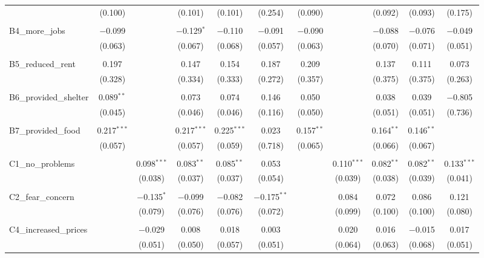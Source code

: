 \begin{table}[H]
\begin{tabular}{@{\extracolsep{4pt}}lcccccccccc}
  & (0.100) &  & (0.101) & (0.101) & (0.254) & (0.090) &  & (0.092) & (0.093) & (0.175) \\ 
  & & & & & & & & & & \\ 
 B4\_more\_jobs & $-$0.099 &  & $-$0.129$^{*}$ & $-$0.110 & $-$0.091 & $-$0.090 &  & $-$0.088 & $-$0.076 & $-$0.049 \\ 
  & (0.063) &  & (0.067) & (0.068) & (0.057) & (0.063) &  & (0.070) & (0.071) & (0.051) \\ 
  & & & & & & & & & & \\ 
 B5\_reduced\_rent & 0.197 &  & 0.147 & 0.154 & 0.187 & 0.209 &  & 0.137 & 0.111 & 0.073 \\ 
  & (0.328) &  & (0.334) & (0.333) & (0.272) & (0.357) &  & (0.375) & (0.375) & (0.263) \\ 
  & & & & & & & & & & \\ 
 B6\_provided\_shelter & 0.089$^{**}$ &  & 0.073 & 0.074 & 0.146 & 0.050 &  & 0.038 & 0.039 & $-$0.805 \\ 
  & (0.045) &  & (0.046) & (0.046) & (0.116) & (0.050) &  & (0.051) & (0.051) & (0.736) \\ 
  & & & & & & & & & & \\ 
 B7\_provided\_food & 0.217$^{***}$ &  & 0.217$^{***}$ & 0.225$^{***}$ & 0.023 & 0.157$^{**}$ &  & 0.164$^{**}$ & 0.146$^{**}$ &  \\ 
  & (0.057) &  & (0.057) & (0.059) & (0.718) & (0.065) &  & (0.066) & (0.067) &  \\ 
  & & & & & & & & & & \\ 
 C1\_no\_problems &  & 0.098$^{***}$ & 0.083$^{**}$ & 0.085$^{**}$ & 0.053 &  & 0.110$^{***}$ & 0.082$^{**}$ & 0.082$^{**}$ & 0.133$^{***}$ \\ 
  &  & (0.038) & (0.037) & (0.037) & (0.054) &  & (0.039) & (0.038) & (0.039) & (0.041) \\ 
  & & & & & & & & & & \\ 
 C2\_fear\_concern &  & $-$0.135$^{*}$ & $-$0.099 & $-$0.082 & $-$0.175$^{**}$ &  & 0.084 & 0.072 & 0.086 & 0.121 \\ 
  &  & (0.079) & (0.076) & (0.076) & (0.072) &  & (0.099) & (0.100) & (0.100) & (0.080) \\ 
  & & & & & & & & & & \\ 
 C4\_increased\_prices &  & $-$0.029 & 0.008 & 0.018 & 0.003 &  & 0.020 & 0.016 & $-$0.015 & 0.017 \\ 
  &  & (0.051) & (0.050) & (0.057) & (0.051) &  & (0.064) & (0.063) & (0.068) & (0.051) \\ 

\end{tabular}
\end{table}
